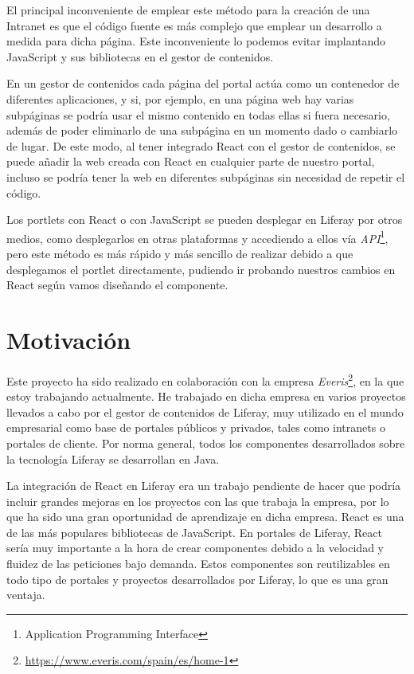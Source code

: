 \documentclass[a4paper, 12pt]{book}
\begin{document}
\vspace{5mm} %
El principal inconveniente de emplear este método para la creación de una Intranet es que el código fuente es más complejo que emplear un desarrollo a medida para dicha página. Este inconveniente lo podemos evitar implantando JavaScript y sus bibliotecas en el gestor de contenidos. 

\vspace{5mm} %
En un gestor de contenidos cada página del portal actúa como un contenedor de diferentes aplicaciones, y si, por ejemplo, en una página web hay varias subpáginas se podría usar el mismo contenido en todas ellas si fuera necesario,  además de poder eliminarlo de una subpágina en un momento dado o cambiarlo de lugar. De este modo, al tener integrado React con el gestor de contenidos, se puede añadir la web creada con React en cualquier parte de nuestro portal, incluso se podría tener la web en diferentes subpáginas sin necesidad de repetir el código.

\vspace{5mm} %
Los portlets con React o con JavaScript se pueden desplegar en Liferay por otros medios, como desplegarlos en otras plataformas y accediendo a ellos vía \textit{API}\footnote{Application Programming Interface}, pero este método es más rápido y más sencillo de realizar debido a que desplegamos el portlet directamente, pudiendo ir probando nuestros cambios en React según vamos diseñando el componente.


\section{Motivaci\'on}
\label{sec:motivacion}
Este proyecto ha sido realizado en colaboración con la empresa \textit{Everis}\footnote{\url{https://www.everis.com/spain/es/home-1}}, en la que estoy trabajando actualmente. He trabajado en dicha empresa en varios proyectos llevados a cabo por el gestor de contenidos de Liferay, muy utilizado en el mundo empresarial como base de portales públicos y privados, tales como intranets o portales de cliente. Por norma general, todos los componentes desarrollados sobre la tecnología Liferay se desarrollan en Java.

\vspace{5mm} %
La integración de React en Liferay era un trabajo pendiente de hacer que podría incluir grandes mejoras en los proyectos con las que trabaja la empresa, por lo que ha sido una gran oportunidad de aprendizaje en dicha empresa. React es una de las más populares bibliotecas de JavaScript. En portales de Liferay, React sería muy importante a la hora de crear componentes debido a la velocidad y fluidez de las peticiones bajo demanda. Estos componentes son reutilizables en todo tipo de portales y proyectos desarrollados por Liferay, lo que es una gran ventaja.
\end{document}
